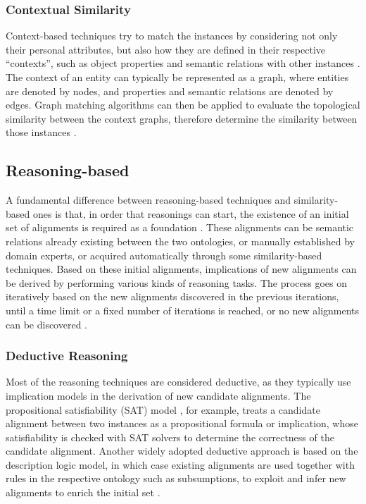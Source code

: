 \subsubsection{Contextual Similarity}

Context-based techniques try to match the instances by considering not only their personal attributes, but also how they are defined in their respective \textquotedblleft contexts\textquotedblright, such as object properties and semantic relations with other instances \cite{DBLP:journals/jucs/LinSX12}. The context of an entity can typically be represented as a graph, where entities are denoted by nodes, and properties and semantic relations are denoted by edges. Graph matching algorithms can then be applied to evaluate the topological similarity between the context graphs, therefore determine the similarity between those instances \cite{DBLP:conf/kdd/JehW02}.

\subsection{Reasoning-based}

A fundamental difference between reasoning-based techniques and similarity-based ones is that, in order that reasonings can start, the existence of an initial set of alignments is required as a foundation \cite{DBLP:conf/esws/Meilicke09}. These alignments can be semantic relations already existing between the two ontologies, or manually established by domain experts, or acquired automatically through some similarity-based techniques. Based on these initial alignments, implications of new alignments can be derived by performing various kinds of reasoning tasks. The process goes on iteratively based on the new alignments discovered in the previous iterations, until a time limit or a fixed number of iterations is reached, or no new alignments can be discovered \cite{DBLP:journals/logcom/MeilickeST09}.

\subsubsection{Deductive Reasoning}

Most of the reasoning techniques are considered deductive, as they typically use implication models in the derivation of new candidate alignments. The propositional satisfiability (SAT) model \cite{DBLP:journals/ai/PhamTS08}, for example, treats a candidate alignment between two instances as a propositional formula or implication, whose satisfiability is checked with SAT solvers to determine the correctness of the candidate alignment. Another widely adopted deductive approach is based on the description logic model, in which case existing alignments are used together with rules in the respective ontology such as subsumptions, to exploit and infer new alignments to enrich the initial set \cite{DBLP:phd/ethos/Reul12}.

